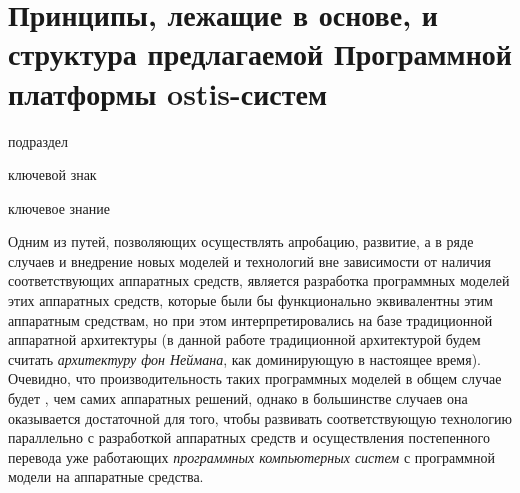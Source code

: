 \section{Принципы, лежащие в основе, и структура предлагаемой Программной платформы ostis-систем}
\label{sec_soft_platform_description}

\begin{SCn}
	
\begin{scnrelfromlist}{подраздел}
\end{scnrelfromlist}

\bigskip

\begin{scnrelfromlist}{ключевой знак}
\end{scnrelfromlist}
	
\begin{scnrelfromlist}{ключевое знание}
\end{scnrelfromlist}
	
\end{SCn}

Одним из путей, позволяющих осуществлять апробацию, развитие, а в ряде случаев и внедрение новых моделей и технологий вне зависимости от наличия соответствующих аппаратных средств, является разработка программных моделей этих аппаратных средств, которые были бы функционально эквивалентны этим аппаратным средствам, но при этом интерпретировались на базе традиционной аппаратной архитектуры (в данной работе традиционной архитектурой будем считать \textit{архитектуру фон Неймана}, как доминирующую в настоящее время). Очевидно, что производительность таких программных моделей в общем случае будет , чем самих аппаратных решений, однако в большинстве случаев она оказывается достаточной для того, чтобы развивать соответствующую технологию параллельно с разработкой аппаратных средств и осуществления постепенного перевода уже работающих \textit{программных компьютерных систем} с программной модели на аппаратные средства.

